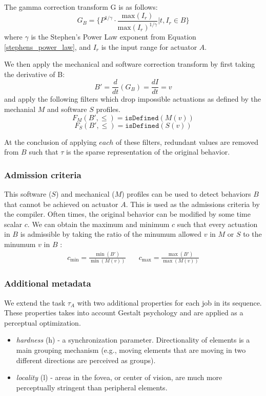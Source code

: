 \documentclass{sigchi}
\begin{document}
    The gamma correction transform G is as follows:
    $$ G_{B} = \{P^{1/\gamma} \cdot \frac{\text{max}(I_r)}{\text{max}(I_r)^{1/\gamma}} \vert t, I_r \in B\} $$
    where $\gamma$ is the Stephen's Power Law exponent from Equation \ref{stephens_power_law}, and $I_r$ is the input range for actuator $A$. 

    We then apply the mechanical and software correction transform by first taking the derivative of B: 
    $$ B' = \frac{d}{dt}(G_{B}) = \frac{dI}{dt} = v  $$
    and apply the following filters which drop impossible actuations as defined by the mechanial $M$ and software $S$ profiles.
    $$ F_M(B', \leq)  = \texttt{isDefined}(M(v))$$
    $$ F_S(B', \leq) = \texttt{isDefined}(S(v))$$

    At the conclusion of applying $each$ of these filters, redundant values are removed from $B$ such that $\tau$ is the sparse representation of the original behavior.

    \subsubsection{Admission criteria}
    This software ($S$) and mechanical ($M$) profiles can be used to detect behaviors $B$ that cannot be achieved on actuator $A$. 
    This is used as the admissions criteria by the compiler. Often times, the original behavior can be modified by some time scalar $c$.  We can obtain the maximum and minimum $c$ such that every actuation in $B$ is admissible by taking the ratio of the minumum allowed $v$ in $M$ or $S$ to the minumum $v$ in $B$ : 
    \begin{equation}
    \begin{split}
        c_{\min } =  \frac{\min (B')}{\min (M(v))}
      \end{split}
    \quad
      \begin{split}
       c_{\max } =  \frac{\max (B')}{\max (M(v))}
    \end{split}
    \end{equation}
   
    \subsubsection{Additional metadata}
    We extend the task $\tau_A$ with two additional properties for each job in its sequence. These properties takes into account Gestalt psychology and are applied as a perceptual optimization.
    \begin{itemize} 
    \item \textit{hardness} (h) - a synchronization parameter. Directionality of elements is a main grouping mechanism (e.g., moving elements that are moving in two different directions are perceived as groups). 
    \item \textit{locality} (l) - areas in the fovea, or center of vision, are much more perceptually stringent than peripheral elements. 
    \end{itemize}
  
\end{document}
